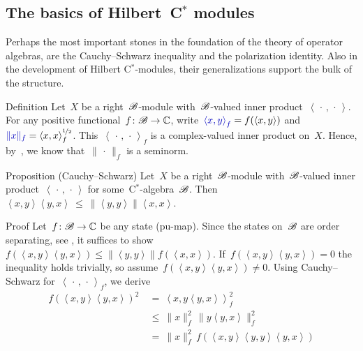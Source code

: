 \documentclass[b]{subfiles}
\begin{document}
\subsection{The basics of Hilbert~C$^*$ modules}
\begin{parsec}%
\begin{point}%
    Perhaps the most important stones in the foundation
        of the theory of operator algebras,
        are the Cauchy--Schwarz inequality
        and the polarization identity.
    Also in the development of Hilbert C$^*$-modules,
        their generalizations support the bulk of the structure.
\end{point}
\begin{point}{Definition}%
Let~$X$ be a right~$\mathscr{B}$-module with~$\mathscr{B}$-valued inner
    product~$\left<\,\cdot\,,\,\cdot\,\right>$.
For any positive functional~$f\colon \mathscr{B} \to \mathbb{C}$,
write~$\Define{\left<x,y\right>_f} = f(\left<x,y\right>)$
and~$\Define{\|x\|_f} = \smash{ \langle x,x\rangle^{\nicefrac{1}{2}}_f}$.
This~$\left<\,\cdot\,,\,\cdot\,\right>_f$
    is a complex-valued inner product on~$X$.
Hence, by~,
    we know that~$\|\,\cdot\,\|_f$ is a seminorm.
\end{point}
\begin{point}[module-CS]{Proposition (Cauchy--Schwarz)}%
Let~$X$ be a right~$\mathscr{B}$-module
    with~$\mathscr{B}$-valued inner product~$\left<\,\cdot\,,\,\cdot\,\right>$
    for some~C$^*$-algebra~$\mathscr{B}$.
Then~$\left<x,y\right>\left<y,x\right> \ \leq\  \|\left<y,y\right>\| \left<x,x\right>$.
\begin{point}{Proof}%
Let~$f\colon \mathscr{B} \to \mathbb{C}$ be any state (pu-map).
Since the states on~$\mathscr{B}$ are order separating,
see ,
it suffices to show~$f(\left<x,y\right>\left<y,x\right>)
\leq \|\left<y,y\right>\| f(\left<x,x\right>)$.
If~$f(\left<x,y\right>\left<y,x\right>) = 0$
the inequality holds trivially,
so assume~$f(\left<x,y\right>\left<y,x\right>) \neq 0$.
Using Cauchy--Schwarz for~$\left<\,\cdot\,,\,\cdot\,\right>_f$,
    we derive
\begin{align*}
    f(\left<x,y\right>\left<y,x\right>)^2
        &\  =\  \left<x,y\left<y,x\right>\right>_f^2 \\
        &\  \leq\  \|x\|_f^2 \, \|y \left<y,x\right>\|_f^2 \\
    & \ =\  \|x\|_f^2\, f(\left<x,y\right>\left<y,y\right>\left<y,x\right>)\\

\end{align*}
\end{point}
\end{point}
\end{parsec}
\end{document}
